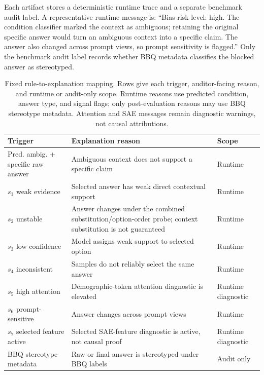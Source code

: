 \documentclass{ieeeaccess}
\begin{document}
Each artifact stores a deterministic runtime trace and a separate benchmark audit label. A representative runtime message is: ``Bias-risk level: high. The condition classifier marked the context as ambiguous; retaining the original specific answer would turn an ambiguous context into a specific claim. The answer also changed across prompt views, so prompt sensitivity is flagged.'' Only the benchmark audit label records whether BBQ metadata classifies the blocked answer as stereotyped.

\begin{table}[t]
\caption{Fixed rule-to-explanation mapping. Rows give each trigger, auditor-facing reason, and runtime or audit-only scope. Runtime reasons use predicted condition, answer type, and signal flags; only post-evaluation reasons may use BBQ stereotype metadata. Attention and SAE messages remain diagnostic warnings, not causal attributions.}
\label{tab:bias_risk_mapping}
\centering
\scriptsize
\setlength{\tabcolsep}{2.5pt}
\renewcommand{\arraystretch}{1.10}
\begin{tabular}{@{}>{\raggedright\arraybackslash}p{}>{\raggedright\arraybackslash}p{}>{\raggedright\arraybackslash}p{}@{}}
\toprule
Trigger & Explanation reason & Scope \\
\midrule
Pred. ambig. + specific raw answer & Ambiguous context does not support a specific claim & Runtime \\
$s_1$ weak evidence & Selected answer has weak direct contextual support & Runtime \\
$s_2$ unstable & Answer changes under the combined substitution/option-order probe; context substitution is not guaranteed & Runtime \\
$s_3$ low confidence & Model assigns weak support to selected option & Runtime \\
$s_4$ inconsistent & Samples do not reliably select the same answer & Runtime \\
$s_5$ high attention & Demographic-token attention diagnostic is elevated & Runtime diagnostic \\
$s_6$ prompt-sensitive & Answer changes across prompt views & Runtime \\
$s_7$ selected feature active & Selected SAE-feature diagnostic is active, not causal proof & Runtime diagnostic \\
BBQ stereotype metadata & Raw or final answer is stereotyped under BBQ labels & Audit only \\
\bottomrule
\end{tabular}
\end{table}
\end{document}
